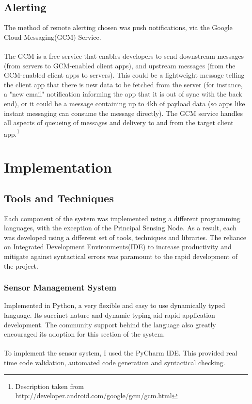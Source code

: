 \documentclass{article}
\begin{document}
\subsection{Alerting}
The method of remote alerting chosen was push notifications, via the Google Cloud Messaging(GCM) Service. \\\\ 
The GCM is a free service that enables developers to send downstream messages (from servers to GCM-enabled client apps), and upstream messages (from the GCM-enabled client apps to servers). This could be a lightweight message telling the client app that there is new data to be fetched from the server (for instance, a "new email" notification informing the app that it is out of sync with the back end), or it could be a message containing up to 4kb of payload data (so apps like instant messaging can consume the message directly). The GCM service handles all aspects of queueing of messages and delivery to and from the target client app.\footnote{Description taken from http://developer.android.com/google/gcm/gcm.html}

\section{Implementation	}

\subsection{Tools and Techniques}
Each component of the system was implemented using a different programming languages, with the exception of the Principal Sensing Node. As a result, each was developed using a different set of tools, techniques and libraries. The reliance on Integrated Development Environments(IDE) to increase productivity and mitigate against syntactical errors was paramount to the rapid development of the project. 

\subsubsection{Sensor Management System}
Implemented in Python, a very flexible and easy to use dynamically typed language. Its succinct nature and dynamic typing aid rapid application development. The community support behind the language also greatly encouraged its adoption for this section of the system. \\\\ To implement the sensor system, I used the PyCharm IDE. This provided real time code validation, automated code generation and syntactical checking.
\end{document}
